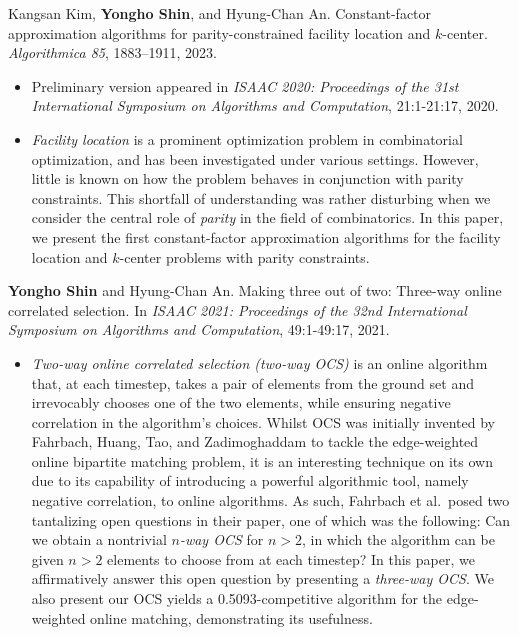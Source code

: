 \documentclass{cv}
\begin{document}
Kangsan Kim, \textbf{Yongho Shin}, and Hyung-Chan An. Constant-factor approximation algorithms for parity-constrained facility location and $k$-center. \emph{Algorithmica 85}, 1883–1911, 2023.
\vspace{\killinitspace}
\begin{itemize}
\item Preliminary version appeared in \emph{ISAAC 2020: Proceedings of the 31st International Symposium on Algorithms and Computation}, 21:1-21:17, 2020.
\item \emph{Facility location} is a prominent optimization problem in combinatorial optimization, and has been investigated under various settings. However, little is known on how the problem behaves in conjunction with parity constraints. This shortfall of understanding was rather disturbing when we consider the central role of \emph{parity} in the field of combinatorics. In this paper, we present the first constant-factor approximation algorithms for the facility location and $k$-center problems with parity constraints.
\end{itemize}

\textbf{Yongho Shin} and Hyung-Chan An. Making three out of two: Three-way online correlated selection. In \emph{ISAAC 2021: Proceedings of the 32nd International Symposium on Algorithms and Computation}, 49:1-49:17, 2021.
\vspace{\killinitspace}
\begin{itemize}
\item \emph{Two-way online correlated selection (two-way OCS)} is an online algorithm that, at each timestep, takes a pair of elements from the ground set and irrevocably chooses one of the two elements, while ensuring negative correlation in the algorithm's choices. Whilst OCS was initially invented by Fahrbach, Huang, Tao, and Zadimoghaddam to tackle the edge-weighted online bipartite matching problem, it is an interesting technique on its own due to its capability of introducing a powerful algorithmic tool, namely negative correlation, to online algorithms. As such, Fahrbach et al.~posed two tantalizing open questions in their paper, one of which was the following: Can we obtain a nontrivial \emph{$n$-way OCS} for $n>2$, in which the algorithm can be given $n>2$ elements to choose from at each timestep? In this paper, we affirmatively answer this open question by presenting a \emph{three-way OCS}. We also present our OCS yields a 0.5093-competitive algorithm for the edge-weighted online matching, demonstrating its usefulness.
\end{itemize}
\end{document}
